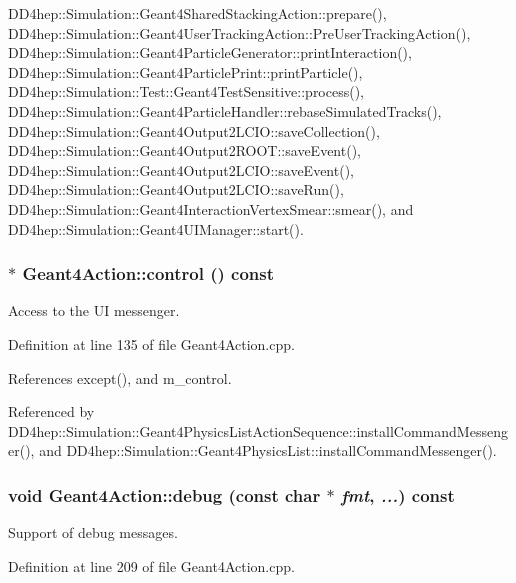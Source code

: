 DD4hep::Simulation::Geant4SharedStackingAction::prepare(), DD4hep::Simulation::Geant4UserTrackingAction::PreUserTrackingAction(), DD4hep::Simulation::Geant4ParticleGenerator::printInteraction(), DD4hep::Simulation::Geant4ParticlePrint::printParticle(), DD4hep::Simulation::Test::Geant4TestSensitive::process(), DD4hep::Simulation::Geant4ParticleHandler::rebaseSimulatedTracks(), DD4hep::Simulation::Geant4Output2LCIO::saveCollection(), DD4hep::Simulation::Geant4Output2ROOT::saveEvent(), DD4hep::Simulation::Geant4Output2LCIO::saveEvent(), DD4hep::Simulation::Geant4Output2LCIO::saveRun(), DD4hep::Simulation::Geant4InteractionVertexSmear::smear(), and DD4hep::Simulation::Geant4UIManager::start().\hypertarget{class_d_d4hep_1_1_simulation_1_1_geant4_action_ae5e218a61d3dceff2d164429b854fb61}{
\subsubsection[{control}]{ $\ast$ Geant4Action::control () const}}
\label{class_d_d4hep_1_1_simulation_1_1_geant4_action_ae5e218a61d3dceff2d164429b854fb61}


Access to the UI messenger. 

Definition at line 135 of file Geant4Action.cpp.

References except(), and m\_\-control.

Referenced by DD4hep::Simulation::Geant4PhysicsListActionSequence::installCommandMessenger(), and DD4hep::Simulation::Geant4PhysicsList::installCommandMessenger().\hypertarget{class_d_d4hep_1_1_simulation_1_1_geant4_action_a89cb100e04f08e07046e7d490a8bc747}{
\subsubsection[{debug}]{\setlength{\rightskip}{0pt plus 5cm}void Geant4Action::debug (const char $\ast$ {\em fmt}, \/   {\em ...}) const}}
\label{class_d_d4hep_1_1_simulation_1_1_geant4_action_a89cb100e04f08e07046e7d490a8bc747}


Support of debug messages. 

Definition at line 209 of file Geant4Action.cpp.

